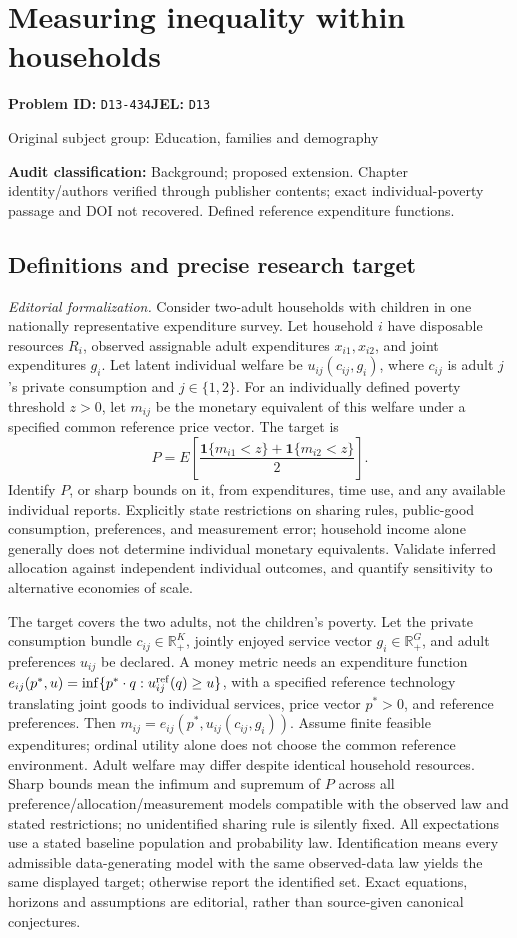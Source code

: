 \documentclass[11pt,a4paper]{article}
\begin{document}
\section*{Measuring inequality within households}
\textbf{Problem ID:} \texttt{D13-434}\quad \textbf{JEL:} \texttt{D13}\par
\label{problem:OP-0458}
{\sffamily\small\color{muted}Original subject group: Education, families and demography\par}
\label{definitions:problem:30007740}
\textbf{Audit classification:} Background; proposed extension. Chapter identity/authors verified through publisher contents; exact individual-poverty passage and DOI not recovered. Defined reference expenditure functions.
\subsection*{Definitions and precise research target}
\textit{Editorial formalization.} Consider two-adult households with children in one nationally representative expenditure survey. Let household \(i\) have disposable resources \(R_i\), observed assignable adult expenditures \(x_{i1},x_{i2}\), and joint expenditures \(g_i\). Let latent individual welfare be \(u_{ij}(c_{ij},g_i)\), where \(c_{ij}\) is adult \(j\)'s private consumption and \(j\in\{1,2\}\). For an individually defined poverty threshold \(z>0\), let \(m_{ij}\) be the monetary equivalent of this welfare under a specified common reference price vector. The target is
\[P=E\!\left[\frac{\mathbf1\{m_{i1}<z\}+\mathbf1\{m_{i2}<z\}}{2}\right].\]
Identify \(P\), or sharp bounds on it, from expenditures, time use, and any available individual reports. Explicitly state restrictions on sharing rules, public-good consumption, preferences, and measurement error; household income alone generally does not determine individual monetary equivalents. Validate inferred allocation against independent individual outcomes, and quantify sensitivity to alternative economies of scale.

The target covers the two adults, not the children's poverty. Let the private consumption bundle \(c_{ij}\in\mathbb R_+^K\), jointly enjoyed service vector \(g_i\in\mathbb R_+^G\), and adult preferences \(u_{ij}\) be declared. A money metric needs an expenditure function \(e_{ij}(p^*,u)=\inf\{p^*\cdot q:u_{ij}^{\rm ref}(q)\geq u\}\), with a specified reference technology translating joint goods to individual services, price vector \(p^*>0\), and reference preferences. Then \(m_{ij}=e_{ij}(p^*,u_{ij}(c_{ij},g_i))\). Assume finite feasible expenditures; ordinal utility alone does not choose the common reference environment. Adult welfare may differ despite identical household resources. Sharp bounds mean the infimum and supremum of \(P\) across all preference/allocation/measurement models compatible with the observed law and stated restrictions; no unidentified sharing rule is silently fixed. All expectations use a stated baseline population and probability law. Identification means every admissible data-generating model with the same observed-data law yields the same displayed target; otherwise report the identified set. Exact equations, horizons and assumptions are editorial, rather than source-given canonical conjectures.
\end{document}
